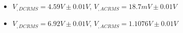 \begin{itemize}
     \item $V_{, DCRMS}=4.59V\pm 0.01\unit{V}$, $V_{, ACRMS}=18.7mV\pm 0.01\unit{V}$ 
     \item $V_{, DCRMS}=6.92V\pm 0.01\unit{V}$, $V_{, ACRMS}=1.1076V\pm 0.01\unit{V}$\\
\end{itemize}